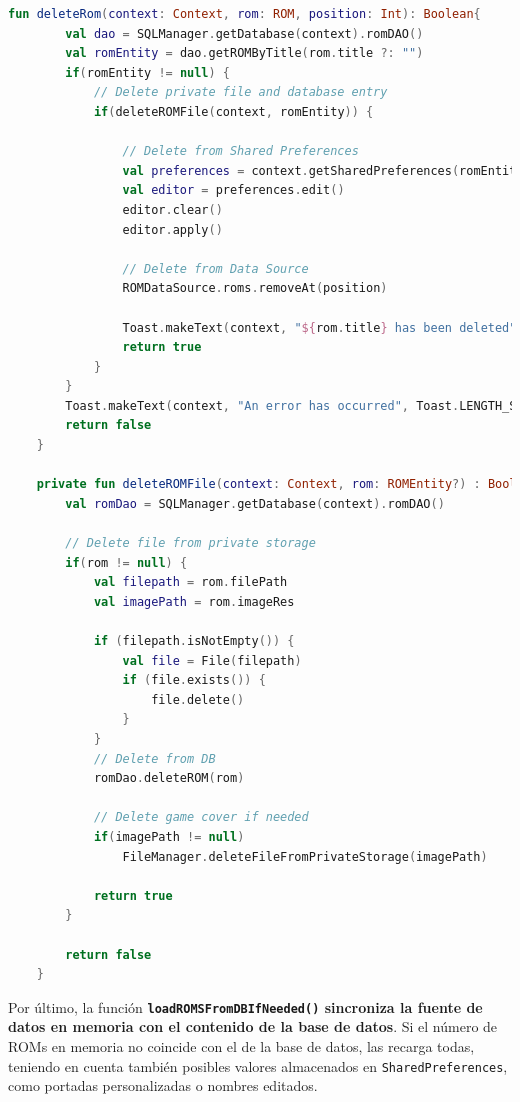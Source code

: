\begin{lstlisting}[language=Kotlin, caption={ROM Management - Eliminar una ROM.}, label={code:romManagementDeleteRom}]
    fun deleteRom(context: Context, rom: ROM, position: Int): Boolean{
        val dao = SQLManager.getDatabase(context).romDAO()
        val romEntity = dao.getROMByTitle(rom.title ?: "")
        if(romEntity != null) {
            // Delete private file and database entry
            if(deleteROMFile(context, romEntity)) {

                // Delete from Shared Preferences
                val preferences = context.getSharedPreferences(romEntity.id.toString(), Context.MODE_PRIVATE)
                val editor = preferences.edit()
                editor.clear()
                editor.apply()

                // Delete from Data Source
                ROMDataSource.roms.removeAt(position)

                Toast.makeText(context, "${rom.title} has been deleted", Toast.LENGTH_SHORT).show()
                return true
            }
        }
        Toast.makeText(context, "An error has occurred", Toast.LENGTH_SHORT).show()
        return false
    }

    private fun deleteROMFile(context: Context, rom: ROMEntity?) : Boolean {
        val romDao = SQLManager.getDatabase(context).romDAO()

        // Delete file from private storage
        if(rom != null) {
            val filepath = rom.filePath
            val imagePath = rom.imageRes

            if (filepath.isNotEmpty()) {
                val file = File(filepath)
                if (file.exists()) {
                    file.delete()
                }
            }
            // Delete from DB
            romDao.deleteROM(rom)

            // Delete game cover if needed
            if(imagePath != null)
                FileManager.deleteFileFromPrivateStorage(imagePath)

            return true
        }

        return false
    }
\end{lstlisting}

Por último, la función \textbf{\texttt{loadROMSFromDBIfNeeded()} sincroniza la fuente de datos en memoria con el contenido de la base de datos}. Si el número de ROMs en memoria no coincide con el de la base de datos, las recarga todas, teniendo en cuenta también posibles valores almacenados en \texttt{SharedPreferences}, como portadas personalizadas o nombres editados.

